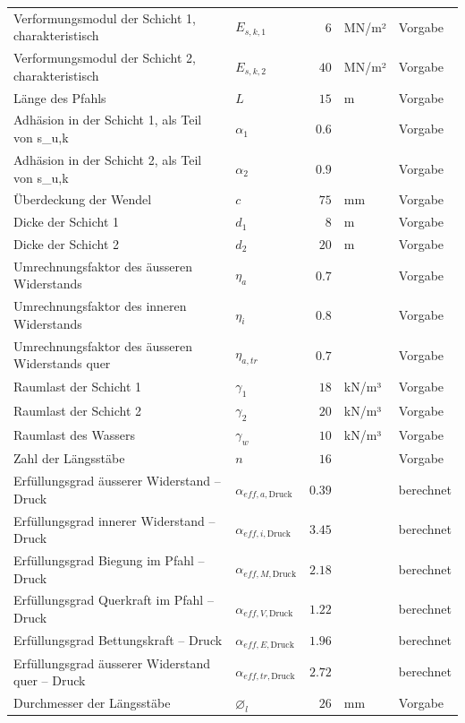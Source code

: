 \documentclass[11pt,a4paper]{article}
\begin{document}
\begin{xltabular}{\linewidth}{>{\raggedright\arraybackslash}Xlrll}
Verformungsmodul der Schicht 1, charakteristisch & $E_{s,k,1}$ & $6$ & MN/m² & Vorgabe \\
Verformungsmodul der Schicht 2, charakteristisch & $E_{s,k,2}$ & $40$ & MN/m² & Vorgabe \\
Länge des Pfahls & $L$ & $15$ & m & Vorgabe \\
Adhäsion in der Schicht 1, als Teil von s\_u,k & $\alpha_{1}$ & $0.6$ &  & Vorgabe \\
Adhäsion in der Schicht 2, als Teil von s\_u,k & $\alpha_{2}$ & $0.9$ &  & Vorgabe \\
Überdeckung der Wendel & $c$ & $75$ & mm & Vorgabe \\
Dicke der Schicht 1 & $d_{1}$ & $8$ & m & Vorgabe \\
Dicke der Schicht 2 & $d_{2}$ & $20$ & m & Vorgabe \\
Umrechnungsfaktor des äusseren Widerstands & $\eta_a$ & $0.7$ &  & Vorgabe \\
Umrechnungsfaktor des inneren Widerstands & $\eta_i$ & $0.8$ &  & Vorgabe \\
Umrechnungsfaktor des äusseren Widerstands quer & $\eta_{a,tr}$ & $0.7$ &  & Vorgabe \\
Raumlast der Schicht 1 & $\gamma_{1}$ & $18$ & kN/m³ & Vorgabe \\
Raumlast der Schicht 2 & $\gamma_{2}$ & $20$ & kN/m³ & Vorgabe \\
Raumlast des Wassers & $\gamma_w$ & $10$ & kN/m³ & Vorgabe \\
Zahl der Längsstäbe & $n$ & $16$ &  & Vorgabe \\
Erfüllungsgrad äusserer Widerstand – Druck & $\alpha_{eff,a,\text{Druck}}$ & $0.39$ &  & berechnet \\
Erfüllungsgrad innerer Widerstand – Druck & $\alpha_{eff,i,\text{Druck}}$ & $3.45$ &  & berechnet \\
Erfüllungsgrad Biegung im Pfahl – Druck & $\alpha_{eff,M,\text{Druck}}$ & $2.18$ &  & berechnet \\
Erfüllungsgrad Querkraft im Pfahl – Druck & $\alpha_{eff,V,\text{Druck}}$ & $1.22$ &  & berechnet \\
Erfüllungsgrad Bettungskraft – Druck & $\alpha_{eff,E,\text{Druck}}$ & $1.96$ &  & berechnet \\
Erfüllungsgrad äusserer Widerstand quer – Druck & $\alpha_{eff,tr,\text{Druck}}$ & $2.72$ &  & berechnet \\
Durchmesser der Längsstäbe & $\varnothing_l$ & $26$ & mm & Vorgabe \\

\end{xltabular}
\end{document}
